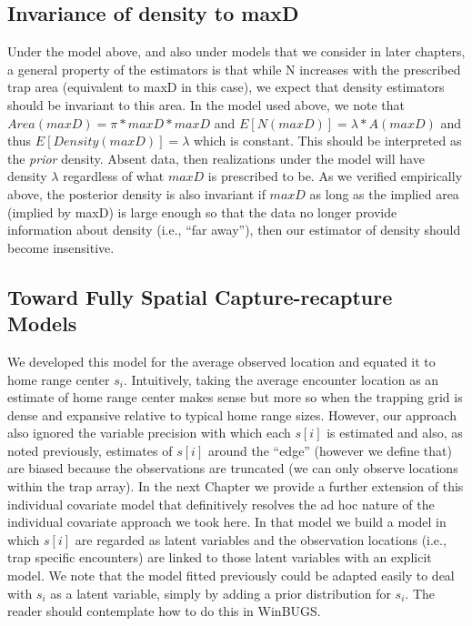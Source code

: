\subsection{Invariance of density to maxD}

Under the model above, and also under models that we consider in later chapters, a general property of the estimators is that while N increases with the prescribed trap area (equivalent to maxD in this case), we expect that density estimators should be invariant to this area. In the model used above, we note that
$Area(maxD) = \pi*maxD*maxD$ and $E[N(maxD)] = \lambda*A(maxD)$ and thus $E[Density(maxD)] = \lambda$  which is constant. This should be interpreted as the {\it prior} density. Absent data, then realizations under the model will have density $\lambda$ regardless of what $maxD$ is prescribed to be.  As we verified empirically above, the posterior density is also invariant if $maxD$ as long as the implied area (implied by maxD) is large enough so that the data no longer provide information about density (i.e., ``far away''), then our estimator of density should become insensitive.

\subsection{Toward Fully Spatial Capture-recapture Models}
We developed this model for the average observed location and equated it to home range center $s_{i}$. Intuitively, taking the average encounter location as an estimate of home range center makes sense but more so when the trapping grid is dense and expansive relative to typical home range sizes.  However, our approach also ignored  the variable precision with which each $s[i]$ is estimated and also, as noted previously, estimates of $s[i]$ around the ``edge'' (however we define that) are biased because the observations are truncated (we can only observe locations within the trap array).  In the next Chapter we provide a further extension of this individual covariate model that definitively resolves the ad hoc nature of the individual covariate approach we took here. In that model we build a model in which $s[i]$ are regarded as latent variables and the observation locations (i.e., trap specific encounters) are linked to those latent variables with an explicit model. We note that the model fitted previously could be adapted easily to deal with $s_{i}$ as a latent variable, simply by adding a prior distribution for $s_{i}$. The reader should contemplate how to do this in WinBUGS.


